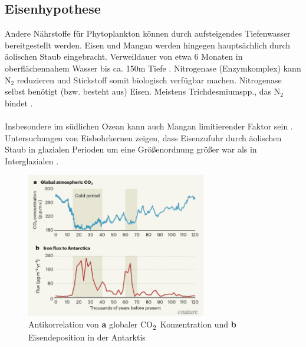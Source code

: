 \documentclass[12pt,a4paper,onecolumn]{scrartcl}
\newcommand{\cotwo}{CO\textsubscript{2}}
\begin{document}
\subsection{Eisenhypothese}
Andere Nährstoffe für Phytoplankton können durch aufsteigendes Tiefenwasser bereitgestellt werden. Eisen und Mangan werden hingegen hauptsächlich durch äolischen Staub eingebracht. Verweildauer von etwa 6 Monaten in oberflächennahem Wasser bis ca. 150m Tiefe \citep{Hayes.2015}. Nitrogenase (Enzymkomplex) kann N$_2$ reduzieren und Stickstoff somit biologisch verfügbar machen. Nitrogenase selbst benötigt (bzw. besteht aus) Eisen. Meistens Trichdesmiumspp., das N$_2$ bindet \citep{Falkowski.1998}.
\\\\ Insbesondere im südlichen Ozean kann auch Mangan limitierender Faktor sein \citep{Browning.2021}. Untersuchungen von Eisbohrkernen zeigen, dass Eisenzufuhr durch äolischen Staub in glazialen Perioden um eine Größenordnung größer war als in Interglazialen \citep{Falkowski.1998}.
\begin{figure}[ht]
\centering
\includegraphics[width=0.7\textwidth]{bilder/Stoll2020/antarctic-iron-global-co2.png}
\caption{Antikorrelation von \textbf{a} globaler \cotwo \ Konzentration und \textbf{b} Eisendeposition in der Antarktis \citep{Stoll.2020}}
\end{figure}
\end{document}
